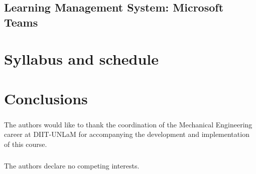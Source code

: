 \documentclass[runningheads]{llncs}
\begin{document}
\subsection{Learning Management System: Microsoft Teams}


\section{Syllabus and schedule}


\section{Conclusions}


\begin{credits}
\subsubsection{\ackname} 
The authors would like to thank the coordination of the Mechanical Engineering career at DIIT-UNLaM for accompanying the development and implementation of this course. 


\subsubsection{\discintname}
The authors declare no competing interests.
\end{credits}


\printbibliography[title= References, heading=bibintoc]
%
%
%
% 
% 
%

\end{document}
